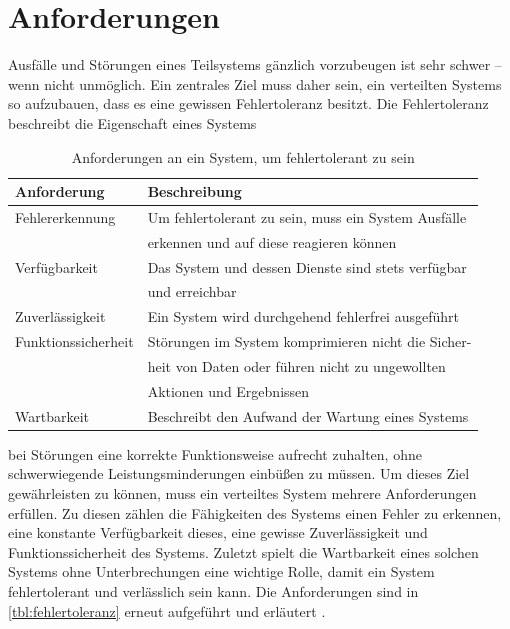 \documentclass[12pt,a4paper,parskip=half]{scrreprt}
\begin{document}
	\section{Anforderungen}
	Ausfälle und Störungen eines Teilsystems gänzlich vorzubeugen ist sehr schwer -- wenn nicht unmöglich. Ein zentrales Ziel muss daher sein, ein verteilten Systems so aufzubauen, dass es eine gewissen Fehlertoleranz besitzt. Die Fehlertoleranz beschreibt die Eigenschaft eines Systems 
	\begin{table}[h]
		\centering
		\begin{tabular}[h]{ll}
			\toprule
			Anforderung 		& Beschreibung \\
			\midrule
			Fehlererkennung		& Um fehlertolerant zu sein, muss ein System Ausfälle\\
			& erkennen und auf diese reagieren können \vspace{4pt} \\
			Verfügbarkeit 		& Das System und dessen Dienste sind stets verfügbar \\
			& und erreichbar \vspace{4pt}\\
			Zuverlässigkeit		& Ein System wird durchgehend fehlerfrei ausgeführt  \vspace{4pt} \\
			Funktionssicherheit	& Störungen im System komprimieren nicht die Sicher-\\
			& heit von Daten oder führen nicht zu ungewollten \\
			& Aktionen und Ergebnissen \vspace{4pt}\\
			Wartbarkeit 		& Beschreibt den Aufwand der Wartung eines Systems\\		
			\bottomrule
		\end{tabular}
		\captionsetup{font = small}
		\caption{Anforderungen an ein System, um fehlertolerant zu sein}
		\label{tbl:fehlertoleranz}
	\end{table}
	bei Störungen eine korrekte Funktionsweise aufrecht zuhalten, ohne schwerwiegende Leistungsminderungen einbüßen zu müssen. Um dieses Ziel gewährleisten zu können, muss ein verteiltes System mehrere Anforderungen erfüllen. Zu diesen zählen die Fähigkeiten des Systems einen Fehler zu erkennen, eine konstante Verfügbarkeit dieses, eine gewisse Zuverlässigkeit und Funktionssicherheit des Systems. Zuletzt spielt die Wartbarkeit eines solchen Systems ohne Unterbrechungen eine wichtige Rolle, damit ein System fehlertolerant und verlässlich sein kann. Die Anforderungen sind in \autoref{tbl:fehlertoleranz} erneut aufgeführt und erläutert \cite{vS-TU-Braunschweig}. 
	
\end{document}
